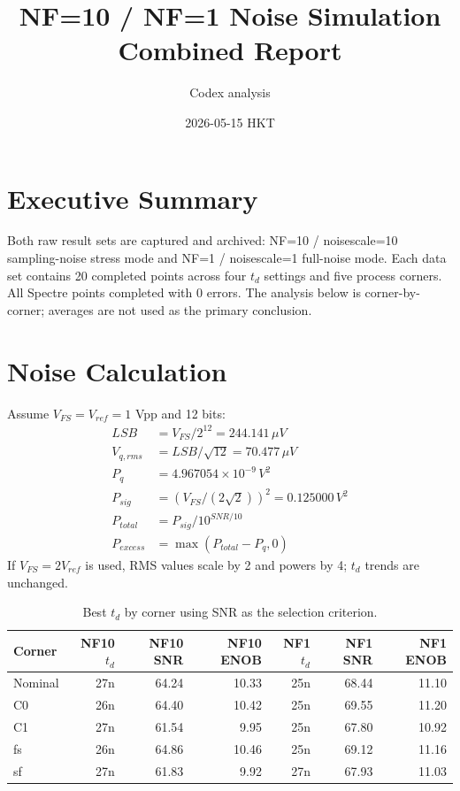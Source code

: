 \documentclass[11pt]{article}
\title{NF=10 / NF=1 Noise Simulation Combined Report}
\author{Codex analysis}
\date{2026-05-15 HKT}
\begin{document}
\maketitle

\section*{Executive Summary}

Both raw result sets are captured and archived: NF=10 / noisescale=10 sampling-noise stress mode and NF=1 / noisescale=1 full-noise mode. Each data set contains 20 completed points across four $t_d$ settings and five process corners. All Spectre points completed with 0 errors. The analysis below is corner-by-corner; averages are not used as the primary conclusion.

\section*{Noise Calculation}

Assume $V_{FS}=V_{ref}=1$ Vpp and 12 bits:
\begin{align*}
LSB &= V_{FS}/2^{12}=244.141\,\mu V \\
V_{q,rms} &= LSB/\sqrt{12}=70.477\,\mu V \\
P_q &= 4.967054\times10^{-9}\,V^2 \\
P_{sig} &= (V_{FS}/(2\sqrt{2}))^2=0.125000\,V^2 \\
P_{total} &= P_{sig}/10^{SNR/10} \\
P_{excess} &= \max(P_{total}-P_q,0)
\end{align*}
If $V_{FS}=2V_{ref}$ is used, RMS values scale by 2 and powers by 4; $t_d$ trends are unchanged.

\begin{table}[H]
\centering
\caption{Best $t_d$ by corner using SNR as the selection criterion.}
\begin{tabular}{lrrrrrr}
\toprule
Corner & NF10 $t_d$ & NF10 SNR & NF10 ENOB & NF1 $t_d$ & NF1 SNR & NF1 ENOB \\
\midrule
Nominal & 27n & 64.24 & 10.33 & 25n & 68.44 & 11.10 \\
C0 & 26n & 64.40 & 10.42 & 25n & 69.55 & 11.20 \\
C1 & 27n & 61.54 & 9.95 & 25n & 67.80 & 10.92 \\
fs & 26n & 64.86 & 10.46 & 25n & 69.12 & 11.16 \\
sf & 27n & 61.83 & 9.92 & 27n & 67.93 & 11.03 \\
\bottomrule
\end{tabular}
\end{table}
\end{document}
